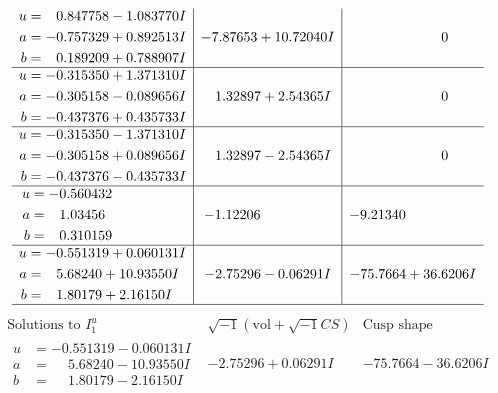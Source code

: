\documentclass[1p]{elsarticle_modified}
\theoremstyle{definition}
\newcommand{\I}{\sqrt{-1}}
\begin{document}
$$\begin{array}{c|c|c}
\begin{aligned}
u &= \phantom{-}0.847758 - 1.083770 I \\
a &= -0.757329 + 0.892513 I \\
b &= \phantom{-}0.189209 + 0.788907 I\end{aligned}
 & -7.87653 + 10.72040 I & \phantom{-0.000000 } 0 \\ \hline\begin{aligned}
u &= -0.315350 + 1.371310 I \\
a &= -0.305158 - 0.089656 I \\
b &= -0.437376 + 0.435733 I\end{aligned}
 & \phantom{-}1.32897 + 2.54365 I & \phantom{-0.000000 } 0 \\ \hline\begin{aligned}
u &= -0.315350 - 1.371310 I \\
a &= -0.305158 + 0.089656 I \\
b &= -0.437376 - 0.435733 I\end{aligned}
 & \phantom{-}1.32897 - 2.54365 I & \phantom{-0.000000 } 0 \\ \hline\begin{aligned}
u &= -0.560432\phantom{ +0.000000I} \\
a &= \phantom{-}1.03456\phantom{ +0.000000I} \\
b &= \phantom{-}0.310159\phantom{ +0.000000I}\end{aligned}
 & -1.12206\phantom{ +0.000000I} & -9.21340\phantom{ +0.000000I} \\ \hline\begin{aligned}
u &= -0.551319 + 0.060131 I \\
a &= \phantom{-}5.68240 + 10.93550 I \\
b &= \phantom{-}1.80179 + 2.16150 I\end{aligned}
 & -2.75296 - 0.06291 I & -75.7664 + 36.6206 I\\
 \hline 
 \end{array}$$\newpage$$\begin{array}{c|c|c}  
\text{Solutions to }I^u_{1}& \I (\text{vol} + \sqrt{-1}CS) & \text{Cusp shape}\\
 \hline 
\begin{aligned}
u &= -0.551319 - 0.060131 I \\
a &= \phantom{-}5.68240 - 10.93550 I \\
b &= \phantom{-}1.80179 - 2.16150 I\end{aligned}
 & -2.75296 + 0.06291 I & -75.7664 - 36.6206 I \\ \hline\begin{aligned}

\end{aligned}
\end{array}$$
\end{document}
